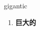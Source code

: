 
\begin{frame}
{\huge gigantic}
\begin{center}
\begin{enumerate}\Large
  \item \textbf{巨大的}
\end{enumerate}
\end{center}
\end{frame}
